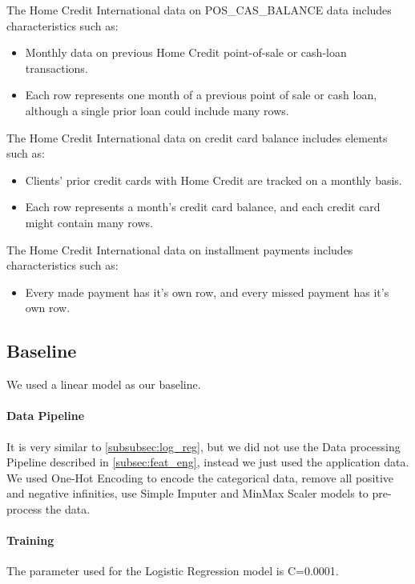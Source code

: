 \documentclass[sigconf, nonacm]{acmart}
\begin{document}
The Home Credit International data on POS\_CAS\_BALANCE data includes characteristics such as:
\begin{itemize} 
	\item Monthly data on previous Home Credit point-of-sale or cash-loan transactions.
	\item Each row represents one month of a previous point of sale or cash loan, although a single prior loan could include many rows.
\end{itemize}

The Home Credit International data on credit card balance includes elements such as:
\begin{itemize}
	\item Clients' prior credit cards with Home Credit are tracked on a monthly basis.
	\item Each row represents a month's credit card balance, and each credit card might contain many rows.
\end{itemize}

The Home Credit International data on installment payments includes characteristics such as:
\begin{itemize}
	\item Every made payment has it's own row, and every missed payment has it's own row.
\end{itemize}

\subsection{Baseline} \label{subsec:baseline}

We used a linear model as our baseline. 

\paragraph{Data Pipeline}
It is very similar to \ref{subsubsec:log_reg}, but we did not use the Data processing Pipeline described in \ref{subsec:feat_eng}, instead we just used the application data. We used One-Hot Encoding\cite{sklearn.preprocessing.onehotencoder} to encode the categorical data, remove all positive and negative infinities, use Simple Imputer\cite{sklearn.impute.simpleimputer} and MinMax Scaler\cite{sklearn.preprocessing.minmaxscaler} models to pre-process the data.

\paragraph{Training}
The parameter used for the Logistic Regression model is C=0.0001. 
\end{document}
